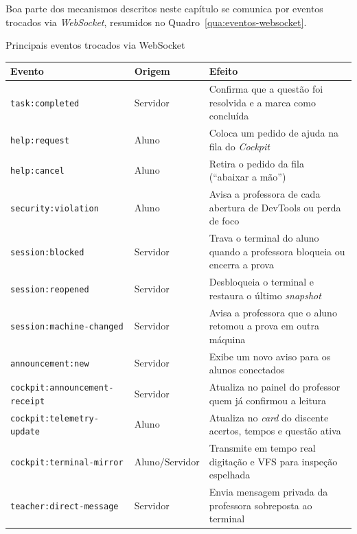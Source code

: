 Boa parte dos mecanismos descritos neste capítulo se comunica por eventos trocados via \textit{WebSocket}, resumidos no Quadro~\ref{qua:eventos-websocket}.

\begin{quadro}[htbp]
    \caption{Principais eventos trocados via WebSocket}
    \label{qua:eventos-websocket}
    \footnotesize
    \begin{tabularx}{\textwidth}{|p{5.2cm}|p{2.2cm}|L|}
        \hline
        \textbf{Evento} & \textbf{Origem} & \textbf{Efeito} \\
        \hline
        \texttt{task:completed} & Servidor & Confirma que a questão foi resolvida e a marca como concluída \\
        \hline
        \texttt{help:request} & Aluno & Coloca um pedido de ajuda na fila do \textit{Cockpit} \\
        \hline
        \texttt{help:cancel} & Aluno & Retira o pedido da fila (``abaixar a mão'') \\
        \hline
        \texttt{security:violation} & Aluno & Avisa a professora de cada abertura de DevTools ou perda de foco \\
        \hline
        \texttt{session:blocked} & Servidor & Trava o terminal do aluno quando a professora bloqueia ou encerra a prova \\
        \hline
        \texttt{session:reopened} & Servidor & Desbloqueia o terminal e restaura o último \textit{snapshot} \\
        \hline
        \texttt{session:machine-changed} & Servidor & Avisa a professora que o aluno retomou a prova em outra máquina \\
        \hline
        \texttt{announcement:new} & Servidor & Exibe um novo aviso para os alunos conectados \\
        \hline
        \texttt{cockpit:announcement-receipt} & Servidor & Atualiza no painel do professor quem já confirmou a leitura \\
        \hline
        \texttt{cockpit:telemetry-update} & Aluno & Atualiza no \textit{card} do discente acertos, tempos e questão ativa \\
        \hline
        \texttt{cockpit:terminal-mirror} & Aluno/Servidor & Transmite em tempo real digitação e VFS para inspeção espelhada \\
        \hline
        \texttt{teacher:direct-message} & Servidor & Envia mensagem privada da professora sobreposta ao terminal \\
        \hline
    \end{tabularx}
\end{quadro}

